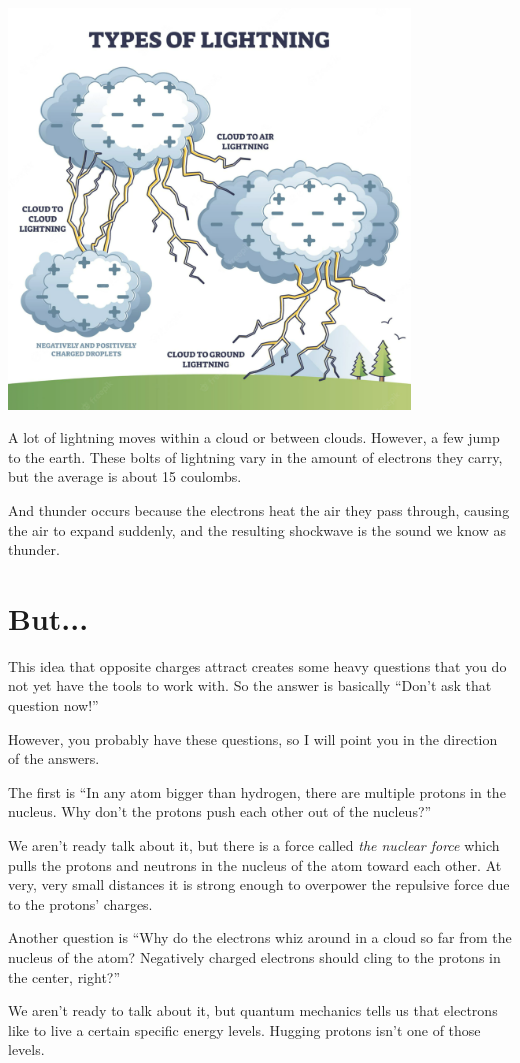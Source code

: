 \includegraphics[width=0.8\textwidth]{Lightning_Diagram.png}

A lot of lightning moves within a cloud or between clouds. However, a
few jump to the earth. These bolts of lightning vary in the amount of
electrons they carry, but the average is about 15 coulombs.

And thunder occurs because the electrons heat the air they pass through, 
causing the air to expand suddenly, and the resulting shockwave is the sound we know as thunder.
\section{But...}

This idea that opposite charges attract creates some heavy questions
that you do not yet have the tools to work with. So the answer is
basically ``Don't ask that question now!''

However, you probably have these questions, so I will point you in
the direction of the answers.

The first is ``In any atom bigger than hydrogen, there are multiple
protons in the nucleus. Why don't the protons push each other out of
the nucleus?''

We aren't ready talk about it, but there is a force called \textit{the
 nuclear force} which pulls the protons and neutrons in the nucleus
of the atom toward each other. At very, very small distances it is
strong enough to overpower the repulsive force due to the protons'
charges.

Another question is ``Why do the electrons whiz around in a cloud so
far from the nucleus of the atom? Negatively charged electrons should
cling to the protons in the center, right?''

We aren't ready to talk about it, but quantum mechanics tells us that
electrons like to live a certain specific energy levels. Hugging
protons isn't one of those levels.
